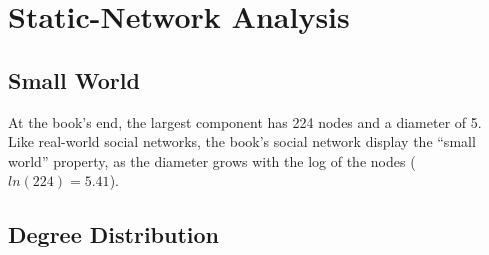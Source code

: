 \section{Static-Network Analysis}

\subsection{Small World}
At the book's end, the largest component has 224 nodes and a diameter of 5. Like real-world social networks, the book's social network display the ``small world'' property, as the diameter grows with the log of the nodes ($ln(224) = 5.41$).

\subsection{Degree Distribution}

